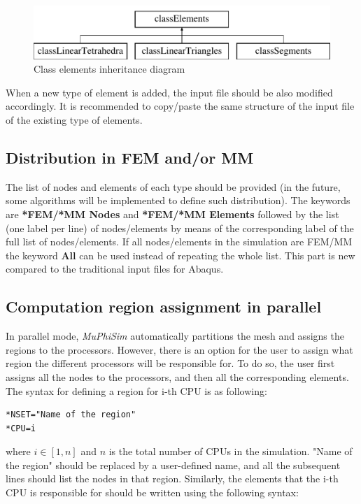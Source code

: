 \documentclass[oneside,11pt,times]{book}
\begin{document}
\begin{figure}[htb]
    \centering
    \includegraphics[width=1\textwidth]{imgs/UserManual/classElements.pdf}
    \caption{Class elements inheritance diagram}
    \label{fig:classElements}
\end{figure}

When a new type of element is added, the input file should be also modified accordingly. It is recommended to copy/paste the same structure of the input file of the existing type of elements.

\subsection{Distribution in FEM and/or MM}
The list of nodes and elements of each type should be provided (in the future, some algorithms will be implemented to define such distribution). The keywords are \textbf{*FEM/*MM Nodes} and \textbf{*FEM/*MM Elements} followed by the list (one label per line) of nodes/elements by means of the corresponding label of the full list of nodes/elements. If all nodes/elements in the simulation are FEM/MM the keyword \textbf{All} can be used instead of repeating the whole list. This part is new compared to the traditional input files for Abaqus.

\subsection{Computation region assignment in parallel}
In parallel mode, \textit{MuPhiSim} automatically partitions the mesh and assigns the regions to the processors. However, there is an option for the user to assign what region the different processors will be responsible for. To do so, the user first assigns all the nodes to the processors, and then all the corresponding elements. The syntax for defining a region for i-th CPU is as following:

\begin{lstlisting}
*NSET="Name of the region"
*CPU=i
\end{lstlisting}

where $i \in [1, n]$ and $n$ is the total number of CPUs in the simulation. "Name of the region" should be replaced by a user-defined name, and all the subsequent lines should list the nodes in that region. Similarly, the elements that the i-th CPU is responsible for should be written using the following syntax:
\end{document}
